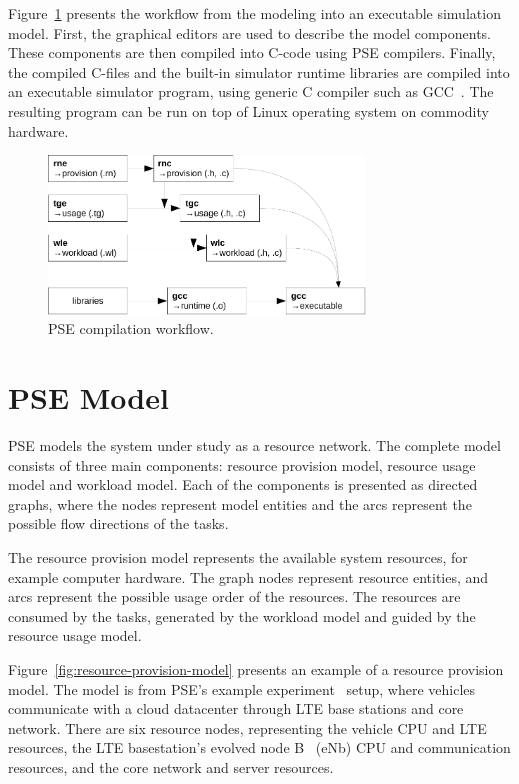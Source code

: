 Figure~\ref{fig:pse-compile-workflow} presents the workflow from the modeling into an executable simulation model. First, the graphical editors are used to describe the model components. These components are then compiled into C-code using PSE compilers. Finally, the compiled C-files and the built-in simulator runtime libraries are compiled into an executable simulator program, using generic C compiler such as GCC~\cite{stallman:2009:gcc}. The resulting program can be run on top of Linux operating system on commodity hardware.

\begin{figure}[]
  \begin{center}
    \includegraphics[width=0.75\textwidth]{images/pse-compile-workflow.pdf}
    \caption{PSE compilation workflow.}
    \label{fig:pse-compile-workflow}
  \end{center}
\end{figure}

\section{PSE Model}
PSE models the system under study as a resource network. The complete model consists of three main components: resource provision model, resource usage model and workload model. Each of the components is presented as directed graphs, where the nodes represent model entities and the arcs represent the possible flow directions of the tasks.

The resource provision model represents the available system resources, for example computer hardware. The graph nodes represent resource entities, and arcs represent the possible usage order of the resources. The resources are consumed by the tasks, generated by the workload model and guided by the resource usage model.

Figure~\ref{fig:resource-provision-model} presents an example of a resource provision model. The model is from PSE's example experiment~\cite{Hanhirova:2014:PSE} setup, where vehicles communicate with a cloud datacenter through LTE base stations and core network. There are six resource nodes, representing the vehicle CPU and LTE resources, the LTE basestation's evolved node B~\cite{Sesia:2009:LTE} (eNb) CPU and communication resources, and the core network and server resources.

